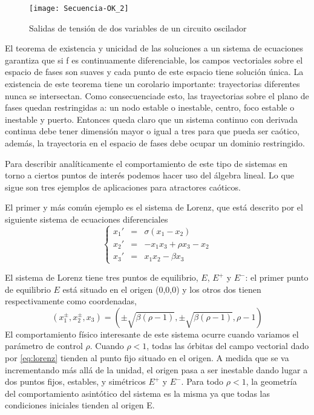 \begin{figure}
\centering\texttt{[image: Secuencia-OK\_2]}
\caption{Salidas de tensión de dos variables de un circuito oscilador}
\label{fig:Secuencia-OK_2}
\end{figure}

El teorema de existencia y unicidad de las soluciones a un sistema de ecuaciones garantiza que si f es continuamente diferenciable, los campos vectoriales sobre el espacio de fases son suaves y cada punto de este espacio tiene solución única.
La existencia de este teorema tiene un corolario importante: trayectorias diferentes nunca se intersectan.
Como consecuenciade esto, las trayectorias sobre el plano de fases quedan restringidas a: un nodo estable o inestable, centro, foco estable o inestable y puerto.
Entonces queda claro que un sistema continuo con derivada continua debe tener dimensión mayor o igual a tres para que pueda ser caótico, además, la trayectoria en el espacio de fases debe ocupar un dominio restringido.

Para describir analíticamente el comportamiento de este tipo de sistemas en torno a ciertos puntos de interés podemos hacer uso del álgebra lineal.
Lo que sigue son tres ejemplos de aplicaciones para atractores caóticos.

El primer y más común ejemplo es el sistema de Lorenz, que está descrito por el siguiente sistema de ecuaciones diferenciales \cite{Lorenz1963}
\begin{equation}\label{eq:lorenz}
\left \{
\begin{array}{rcl}
x_1' &=& \sigma (x_1-x_2)\\
x_2' &=& -x_1x_3+\rho x_3-x_2\\
x_3' &=& x_1x_2-\beta x_3
\end{array}
\right.
\end{equation}

El sistema de Lorenz tiene tres puntos de equilibrio, $E$, $E^+$ y $E^-$: el primer punto de equilibrio $E$ está situado en el origen (0,0,0) y los otros dos tienen respectivamente como coordenadas,
\begin{equation}
(x_1^\pm,x_2^\pm,x_3)=\left(\pm \sqrt{\beta(\rho-1)},\pm \sqrt{\beta(\rho-1)},\rho - 1\right) \nonumber
\end{equation}
El comportamiento físico interesante de este sistema ocurre cuando variamos el parámetro de control $\rho$.
Cuando $\rho<1$, todas las órbitas del campo vectorial dado por \ref{eq:lorenz} tienden al punto fijo situado en el origen.
A medida que se va incrementando más allá de la unidad, el origen pasa a ser inestable dando lugar a dos puntos fijos, estables, y simétricos $E^+$ y $E^-$. Para todo $\rho<1$, la geometría del comportamiento asintótico del sistema es la misma ya que todas las condiciones iniciales tienden al origen E.

